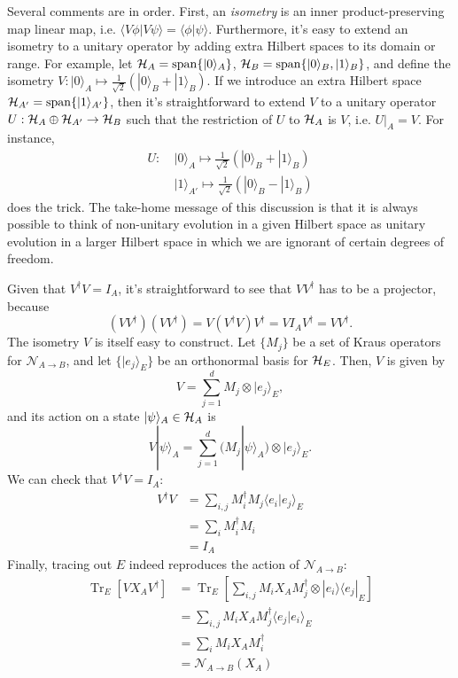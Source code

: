 \documentclass[a4paper,11pt]{article}
\DeclareMathOperator{\Tr}{Tr}
\DeclareMathOperator{\Span}{span}
\newcommand{\ket}[1]{|#1\rangle}
\newcommand{\braket}[2]{\langle #1|#2\rangle}
\newcommand{\ketbra}[2]{| #1 \rangle \langle #2 |}
\newcommand{\Hil}{{\cal H}}
\begin{document}
Several comments are in order.
First, an \emph{isometry} is an inner product-preserving map linear map, i.e. $\braket{V\phi}{V\psi} = \braket{\phi}{\psi}$.
Furthermore, it's easy to extend an isometry to a unitary operator by adding extra Hilbert spaces to its domain or range.
For example, let $\Hil_A = \Span \{\ket{0}_A\}$, $\Hil_B = \Span \{\ket{0}_B, \ket{1}_B\}$, and define the isometry $V : \ket{0}_A \mapsto \tfrac{1}{\sqrt{2}} (\ket{0}_B + \ket{1}_B)$.
If we introduce an extra Hilbert space $\Hil_{A'} = \Span \{\ket{1}_{A'}\}$, then it's straightforward to extend $V$ to a unitary operator $U : \Hil_{A} \oplus \Hil_{A'} \rightarrow \Hil_B$ such that the restriction of $U$ to $\Hil_A$ is $V$, i.e. $U|_A = V$.
For instance,
\begin{equation}
\begin{aligned}
U : ~ &\ket{0}_A \mapsto \frac{1}{\sqrt{2}} (\ket{0}_B + \ket{1}_B) \\
&\ket{1}_{A'} \mapsto \frac{1}{\sqrt{2}} (\ket{0}_B - \ket{1}_B)
\end{aligned}
\end{equation}
does the trick.
The take-home message of this discussion is that it is always possible to think of non-unitary evolution in a given Hilbert space as unitary evolution in a larger Hilbert space in which we are ignorant of certain degrees of freedom.

Given that $V^\dagger V = I_A$, it's straightforward to see that $VV^\dagger$ has to be a projector, because
\begin{equation}
(VV^\dagger)(VV^\dagger) = V(V^\dagger V)V^\dagger = V I_A V^\dagger = VV^\dagger.
\end{equation}
The isometry $V$ is itself easy to construct.
Let $\{M_j\}$ be a set of Kraus operators for $\mathcal{N}_{A\rightarrow B}$, and let $\{ \ket{e_j}_E \}$ be an orthonormal basis for $\Hil_E$.
Then, $V$ is given by
\begin{equation}
V = \sum_{j=1}^d M_j \otimes \ket{e_j}_E,
\end{equation}
and its action on a state $\ket{\psi}_A \in \Hil_A$ is
\begin{equation}
V\ket{\psi}_A = \sum_{j=1}^d (M_j \ket{\psi}_A) \otimes \ket{e_j}_E.
\end{equation}
We can check that $V^\dagger V = I_A$:
\begin{align*}
V^\dagger V &= \sum_{i,j} M_i^\dagger M_j \braket{e_i}{e_j}_E \\
&= \sum_i M_i^\dagger M_i \\
&= I_A
\end{align*}
Finally, tracing out $E$ indeed reproduces the action of $\mathcal{N}_{A\rightarrow B}$:
\begin{align*}
\Tr_E[V X_A V^\dagger] &= \Tr_E \left[ \sum_{i,j} M_i X_A M_j^\dagger \otimes \ketbra{e_i}{e_j}_E  \right] \\
&= \sum_{i,j} M_i X_A M_j^\dagger \braket{e_j}{e_i}_E \\
&= \sum_{i} M_i X_A M_i^\dagger \\
&= \mathcal{N}_{A \rightarrow B}(X_A)
\end{align*}
\end{document}
